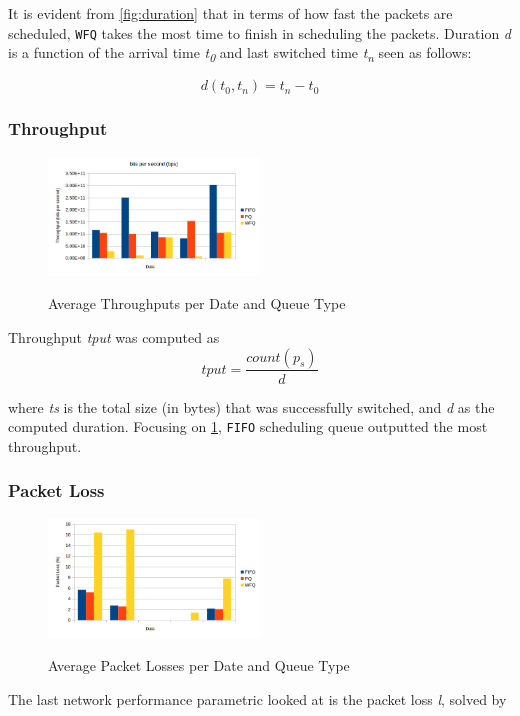 \documentclass[journal]{IEEE/IEEEtran}
\begin{document}
It is evident from \ref{fig:duration} that in terms of how fast the packets are scheduled, \texttt{WFQ} takes the most time to finish in scheduling the packets. Duration \textit{d} is a function of the arrival time \textit{t\textsubscript{0}} and last switched time \textit{t\textsubscript{n}} seen as follows:

\[
	d(t_0, t_n) = t_n - t_0
\]

\subsubsection{Throughput}
\begin{figure}
\includegraphics[width=0.5\textwidth]{throughput}
\label{fig:throughput}\caption{Average Throughputs per Date and Queue Type}
\end{figure}

Throughput \textit{tput} was computed as 
\[
	tput = \frac{count(p_s)}{d}
\]

where \textit{ts} is the total size (in bytes) that was successfully switched, and \textit{d} as the computed duration. Focusing on \ref{fig:throughput}, \texttt{FIFO} scheduling queue outputted the most throughput.

\subsubsection{Packet Loss}
\begin{figure}
\includegraphics[width=0.5\textwidth]{packetloss}
\label{fig:packetloss}\caption{Average Packet Losses per Date and Queue Type}
\end{figure}

The last network performance parametric looked at is the packet loss \textit{l}, solved by
\end{document}
